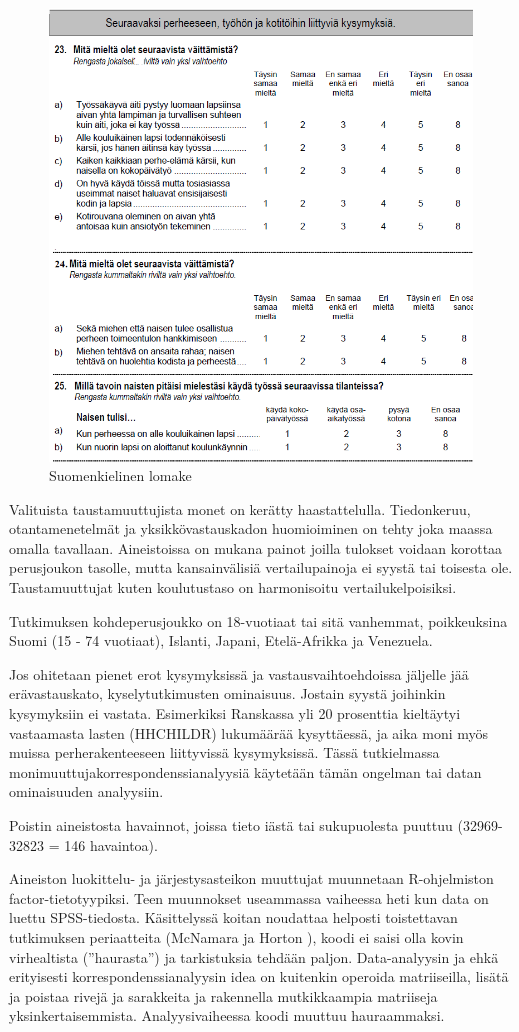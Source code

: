 \documentclass[
  finnish,
]{book}
\begin{document}
\begin{figure}

{\centering \includegraphics[width=0.5\linewidth]{img/substvar_fi_Q1Q2} 

}

\caption{Suomenkielinen lomake}\label{fig:suom-kys}
\end{figure}

Valituista taustamuuttujista monet on kerätty haastattelulla.
Tiedonkeruu, otantamenetelmät ja yksikkövastauskadon huomioiminen on tehty joka
maassa omalla tavallaan. Aineistoissa on mukana painot joilla tulokset voidaan
korottaa perusjoukon tasolle, mutta kansainvälisiä vertailupainoja ei syystä tai
toisesta ole. Taustamuuttujat kuten koulutustaso on harmonisoitu
vertailukelpoisiksi.

Tutkimuksen kohdeperusjoukko on 18-vuotiaat tai sitä vanhemmat,
poikkeuksina Suomi (15 - 74 vuotiaat), Islanti, Japani, Etelä-Afrikka ja Venezuela.

Jos ohitetaan pienet erot kysymyksissä ja vastausvaihtoehdoissa jäljelle jää
erävastauskato, kyselytutkimusten ominaisuus. Jostain syystä joihinkin kysymyksiin
ei vastata. Esimerkiksi Ranskassa yli 20 prosenttia kieltäytyi vastaamasta lasten
(HHCHILDR) lukumäärää kysyttäessä, ja aika moni myös muissa perherakenteeseen
liittyvissä kysymyksissä. Tässä tutkielmassa monimuuttujakorrespondenssianalyysiä
käytetään tämän ongelman tai datan ominaisuuden analyysiin.

Poistin aineistosta havainnot, joissa tieto iästä tai sukupuolesta puuttuu
(32969-32823 = 146 havaintoa).

Aineiston luokittelu- ja järjestysasteikon muuttujat muunnetaan R-ohjelmiston
factor-tietotyypiksi. Teen muunnokset useammassa vaiheessa heti kun data on
luettu SPSS-tiedosta. Käsittelyssä koitan noudattaa helposti toistettavan
tutkimuksen periaatteita (McNamara ja Horton \citep{RefWorks:doc:5c3759c2e4b0085b307c82b5} ),
koodi ei saisi olla kovin virhealtista (''haurasta'') ja tarkistuksia tehdään
paljon. Data-analyysin ja ehkä erityisesti korrespondenssianalyysin idea on
kuitenkin operoida matriiseilla, lisätä ja poistaa rivejä ja sarakkeita ja
rakennella mutkikkaampia matriiseja yksinkertaisemmista.
Analyysivaiheessa koodi muuttuu hauraammaksi.
\end{document}
